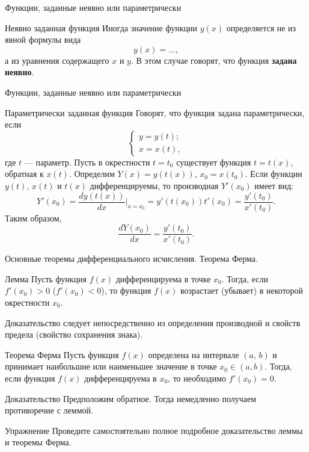 \documentclass[8pt]{beamer}
\begin{document}
\begin{frame}{Функции, заданные неявно или параметрически}
\begin{block}{Неявно заданная функция}
Иногда значение функции $y(x)$ определяется не из явной формулы вида
$$y(x) = \ldots,$$
а из уравнения содержащего $x$ и $y$. В этом случае говорят, что функция {\bf задана неявно}. 
\end{block}

\end{frame}

\begin{frame}{Функции, заданные неявно или параметрически}
\begin{block}{Параметрически заданная функция}
Говорят, что функция задана параметрически, если
$$
\left\{ \begin{array}{l}
y=y(t);\\
x=x(t),
\end{array}
\right.
$$
где $t$ --- параметр. Пусть в окрестности $t=t_0$  существует функция $t=t(x)$, обратная к $x(t)$. Определим $Y(x)=y(t(x))$, $x_0=x(t_0)$. Если функции $y(t)$, $x(t)$ и $t(x)$ дифференцируемы, то производная $Y'(x_0)$ имеет вид:
$$Y'(x_0)=\frac{dy(t(x))}{dx}\Big|_{x=x_0}=y'(t(x_0))t'(x_0)=\frac{y'(t_0)}{x'(t_0)}.$$
Таким образом,
$$\frac{dY(x_0)}{dx}=\frac{y'(t_0)}{x'(t_0)}.$$
\end{block}
\end{frame}

\begin{frame}{Основные теоремы дифференциального исчисления. Теорема Ферма.}
\begin{block}{Лемма}
Пусть функция $f(x)$ дифференцируема в точке $x_0$. Тогда, если $f'(x_0)>0$ ($f'(x_0)<0$), то функция $f(x)$ возрастает (убывает) в некоторой окрестности $x_0$.
\end{block}
Доказательство следует непосредственно из определения производной и свойств предела (свойство сохранения знака).
\begin{block}{Теорема Ферма}
Пусть функция $f(x)$ определена на интервале $(a,\,b)$ и принимает наибольшие или наименьшее значение в точке $x_0\in(a,b)$. Тогда, если функция $f(x)$ дифференцируема в $x_0$, то необходимо $f'(x_0)=0$.
\end{block}
\begin{block}{Доказательство}
Предположим обратное. Тогда немедленно получаем противоречие с леммой.
\end{block}
\begin{block}{Упражнение}
Проведите самостоятельно полное подробное доказательство леммы и теоремы Ферма.
\end{block}
\end{frame}
\end{document}
